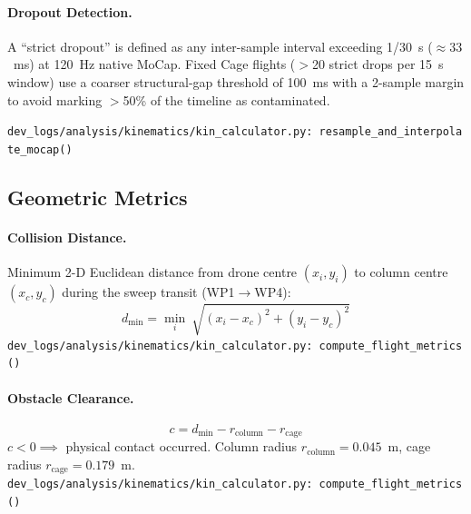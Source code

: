 \medskip
\paragraph{Dropout Detection.}
A ``strict dropout'' is defined as any inter-sample interval exceeding 1/30~s ($\approx 33$~ms) at 120~Hz native MoCap. Fixed Cage flights ($>$20 strict drops per 15~s window) use a coarser structural-gap threshold of 100~ms with a 2-sample margin to avoid marking $>$50\% of the timeline as contaminated.

\texttt{\small dev\_logs/analysis/kinematics/kin\_calculator.py:\ resample\_and\_interpolate\_mocap()}

\subsection{Geometric Metrics}

\paragraph{Collision Distance.}
Minimum 2-D Euclidean distance from drone centre $(x_i, y_i)$ to column centre $(x_c, y_c)$ during the sweep transit (WP1$\to$WP4):
\begin{equation}
    d_{\min} = \min_{i}\ \sqrt{(x_i - x_c)^2 + (y_i - y_c)^2}
\end{equation}
\texttt{\small dev\_logs/analysis/kinematics/kin\_calculator.py:\ compute\_flight\_metrics()}

\medskip
\paragraph{Obstacle Clearance.}
\begin{equation}
    c = d_{\min} - r_{\text{column}} - r_{\text{cage}}
\end{equation}
$c < 0 \implies$ physical contact occurred. Column radius $r_{\text{column}} = 0.045$~m, cage radius $r_{\text{cage}} = 0.179$~m.\\
\texttt{\small dev\_logs/analysis/kinematics/kin\_calculator.py:\ compute\_flight\_metrics()}

\medskip
